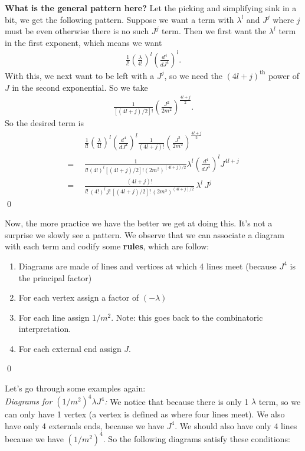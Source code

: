 \documentclass{book}
\theoremstyle{definition}
\newcommand{\f}[2]{\frac{#1}{#2}}
\newcommand{\lp}{\left(}
\newcommand{\rp}{\right)}
\begin{document}
\textbf{What is the general pattern here?} Let the picking and simplifying sink in a bit, we get the following pattern. Suppose we want a term with $\lambda^l$ and $J^{j}$ where $j$ must be even otherwise there is no such $J^j$ term. Then we first want the $\lambda^l$ term in the first exponent, which means we want
\begin{align}
\f{1}{l!}\lp\f{\lambda}{4!}\rp^l \lp\f{d^4}{dJ^4}\rp^l.
\end{align}
With this, we next want to be left with a $J^j$, so we need the $(4l + j)^\text{th}$ power of $J$ in the second exponential. So we take
\begin{align}
\f{1}{[(4l + j)/2]!}\lp \f{J^2}{2m^2} \rp^\f{4l + j}{2}.
\end{align}
So the desired term is 
\begin{align}
&\,\,\,\f{1}{l!}\lp\f{\lambda}{4!}\rp^l \lp\f{d^4}{dJ^4}\rp^l \f{1}{(4l + j)!}\lp \f{J^2}{2m^2} \rp^\f{4l + j}{2} \\
=&\,\,\,\f{1}{l!(4!)^l [(4l+j)/2]! (2m^2)^{(4l+j)/2}} \lambda^l  \lp\f{d^4}{dJ^4}\rp^l J^{4l + j} \\ 
= &\,\,\, \boxed{\f{(4l + j)!}{l!\,(4!)^l\, j!\, [(4l+j)/2]!\,     (2m^2)^{(4l+j)/2}} \,\lambda^l \, J^j}
\end{align}\qed



Now, the more practice we have the better we get at doing this. It's not a surprise we slowly see a pattern. We observe that we can associate a diagram with each term and codify some \textbf{rules}, which are follow:
\begin{enumerate}
	\item Diagrams are made of lines and vertices at which 4 lines meet (because $J^4$ is the principal factor)
	\item For each vertex assign a factor of $(-\lambda)$
	\item For each line assign $1/m^2$. Note: this goes back to the combinatoric interpretation.
	\item For each external end assign $J$.
\end{enumerate}\qed


Let's go through some examples again:\\


\textit{Diagrams for $(1/m^2)^4 \lambda J^4$:} We notice that because there is only 1 $\lambda$ term, so we can only have 1 vertex (a vertex is defined as where four lines meet). We also have only 4 externals ends, because we have $J^4$. We should also have only 4 lines because we have $(1/m^2)^4$. So the following diagrams satisfy these conditions:\\
\end{document}
